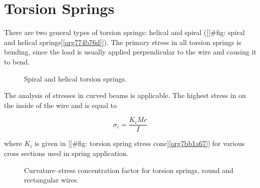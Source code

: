 \documentclass[a4paper,openany,12pt]{book}
\begin{document}
{{\section{Torsion Springs}
\label{sec:org4e39e58}
There are two general types of torsion springs: helical and spiral
([[\#fig: spiral and helical springs]\ref{org774b76d}]).
The primary stress in all torsion springs is bending, since the load is
usually applied perpendicular to the wire and causing it to bend.

\begin{figure}[h]
  \centering
  \caption{Spiral and helical torsion springs.}
  \label{fig: spiral and helical springs}
\end{figure}

The analysis of stresses in curved beams is applicable. The highest
stress in on the inside of the wire and is equal to

$$\sigma_i = \frac{K_iMc}{I}$$

where \(K_i\) is given in [[\#fig: torsion spring stress conc]\ref{org7bb1a67}] for various cross sections used in spring application.

\begin{figure}[h]
  \centering
  \caption{Curvature--stress concentration factor for torsion springs, round and rectangular wires.}
  \label{fig: torsion spring stress conc}
\end{figure}

}}
\end{document}
